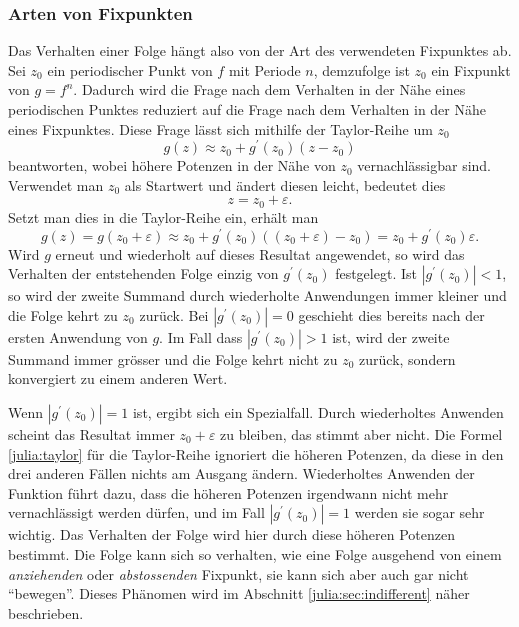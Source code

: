 \subsubsection{Arten von Fixpunkten}
\label{julia:arten_periodische_punkte}
Das Verhalten einer Folge hängt also von der Art des verwendeten Fixpunktes ab.
Sei $z_0$ ein periodischer Punkt von $f$ mit Periode $n$, demzufolge ist $z_0$ ein Fixpunkt von $g = f^n$.
Dadurch wird die Frage nach dem Verhalten in der Nähe eines periodischen Punktes reduziert auf die Frage nach dem Verhalten in der Nähe eines Fixpunktes.
Diese Frage lässt sich mithilfe der Taylor-Reihe um $z_0$
\begin{equation*}
    g(z) \approx z_0 + g^\prime(z_0) (z - z_0)
    \label{julia:taylor}
\end{equation*}
beantworten, wobei höhere Potenzen in der Nähe von $z_0$ vernachlässigbar sind.
Verwendet man $z_0$ als Startwert und ändert diesen leicht, bedeutet dies
\begin{equation*}
    z = z_0 + \varepsilon.
\end{equation*}
Setzt man dies in die Taylor-Reihe ein, erhält man
\begin{equation*}
    g(z) = g(z_0 + \varepsilon) \approx z_0 + g^\prime(z_0) \left((z_0 + \varepsilon) - z_0\right) = z_0 + g^\prime(z_0) \varepsilon.
\end{equation*}
Wird $g$ erneut und wiederholt auf dieses Resultat angewendet, so wird das Verhalten der entstehenden Folge einzig von $g^\prime(z_0)$ festgelegt.
Ist $|g^\prime(z_0)| < 1$, so wird der zweite Summand durch wiederholte Anwendungen immer kleiner und die Folge kehrt zu $z_0$ zurück.
Bei $|g^\prime(z_0)| = 0$ geschieht dies bereits nach der ersten Anwendung von $g$.
Im Fall dass $|g^\prime(z_0)| > 1$ ist, wird der zweite Summand immer grösser und die Folge kehrt nicht zu $z_0$ zurück, sondern konvergiert zu einem anderen Wert.

Wenn $|g^\prime(z_0)| = 1$ ist, ergibt sich ein Spezialfall.
Durch wiederholtes Anwenden scheint das Resultat immer $z_0 + \varepsilon$ zu bleiben, das stimmt aber nicht.
Die Formel \eqref{julia:taylor} für die Taylor-Reihe ignoriert die höheren Potenzen, da diese in den drei anderen Fällen nichts am Ausgang ändern.
Wiederholtes Anwenden der Funktion führt dazu, dass die höheren Potenzen irgendwann nicht mehr vernachlässigt werden dürfen, und im Fall $|g^\prime(z_0)| = 1$ werden sie sogar sehr wichtig.
Das Verhalten der Folge wird hier durch diese höheren Potenzen bestimmt.
Die Folge kann sich so verhalten, wie eine Folge ausgehend von einem \emph{anziehenden} oder \emph{abstossenden} Fixpunkt, sie kann sich aber auch gar nicht ``bewegen''.
Dieses Phänomen wird im Abschnitt \ref{julia:sec:indifferent} näher beschrieben.

